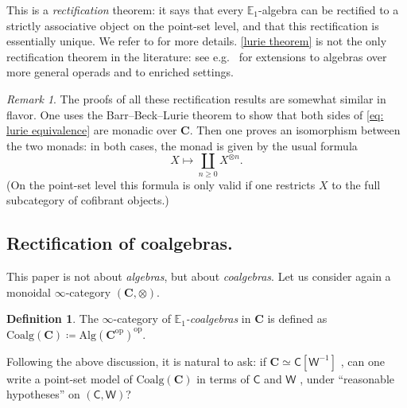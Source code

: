 \documentclass[a4paper,12pt]{amsart}
\theoremstyle{plain}
\theoremstyle{definition}
\newtheorem{definition}[theorem]{Definition}%
\theoremstyle{remark}
\newtheorem{remark}[theorem]{\sc Remark}%
\begin{document}
This is a \emph{rectification} theorem: it says that every $\mathbb E_1$-algebra can be rectified to a strictly associative object on the point-set level, and that this rectification is essentially unique. We refer to \cite[Section 4.1.8]{HigherAlgebra} for more details. \cref{lurie theorem} is not the only rectification theorem in the literature: see e.g.\ \cite{haugseng-rectification,HinichRectification,PavlovScholbach18} for extensions to algebras over more general operads and to enriched settings. 

\begin{remark}\label{strategy remark}
    The proofs of all these rectification results are somewhat similar in flavor. One uses the Barr--Beck--Lurie theorem to show that both sides of \eqref{eq: lurie equivalence} are monadic over $\mathbf C$. Then one proves an isomorphism between the two monads: in both cases, the monad is given by the usual formula
\begin{equation}\label{classical free algebra} X \mapsto \coprod_{n \geq 0} X^{\otimes n}.\end{equation}
(On the point-set level this formula is only valid if one restricts $X$ to the full subcategory of cofibrant objects.)
\end{remark}

\subsection{Rectification of coalgebras.} This paper is not about \emph{algebras}, but about \emph{coalgebras}. 
Let us consider again a monoidal $\infty$-category $(\mathbf C,\otimes)$. 

\begin{definition}\label{def:coalgebra}The $\infty$-category of \emph{$\mathbb E_1$-coalgebras} in $\mathbf{C}$ is defined as $\mathrm{Coalg}(\mathbf C) \coloneqq \mathrm{Alg}(\mathbf C^{\mathrm{op}})^{\mathrm{op}}$.
\end{definition} 

Following the above discussion, it is natural %
to ask: if $\mathbf C \simeq \mathsf C[\mathsf W^{-1}]$%
, can one write a point-set model of $\mathrm{Coalg}(\mathbf C)$ in terms of $\mathsf C$ and $\mathsf W$%
, under ``reasonable hypotheses''  on $(\mathsf C,\mathsf W)$? 
\end{document}
